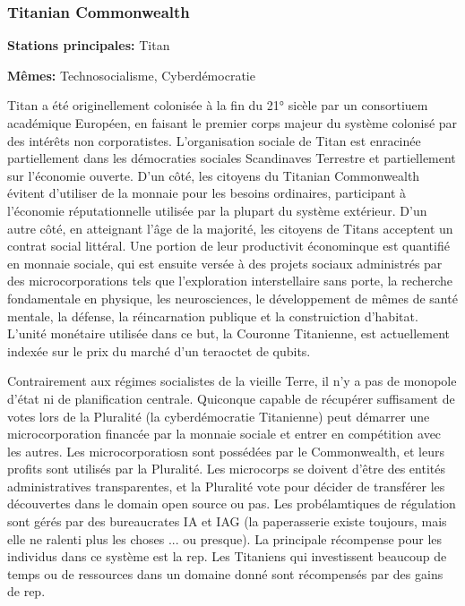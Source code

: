 \subsubsection{Titanian Commonwealth} \label{sec:titan-comm} 

\textbf{Stations principales:} Titan 

\textbf{Mêmes:} Technosocialisme, Cyberdémocratie 

Titan a été originellement colonisée à la fin du 21° sicèle par un consortiuem académique Européen, en faisant le premier corps majeur du système colonisé par des intérêts non corporatistes. L'organisation sociale de Titan est enracinée partiellement dans les démocraties sociales Scandinaves Terrestre et partiellement sur l'économie ouverte. D'un côté, les citoyens du Titanian Commonwealth évitent d'utiliser de la monnaie pour les besoins ordinaires, participant à l'économie réputationnelle utilisée par la plupart du système extérieur. D'un autre côté, en atteignant l'âge de la majorité, les citoyens de Titans acceptent un contrat social littéral. Une portion de leur productivit économinque est quantifié en monnaie sociale, qui est ensuite versée à des projets sociaux administrés par des microcorporations tels que l'exploration interstellaire sans porte, la recherche fondamentale en physique, les neurosciences, le développement de mêmes de santé mentale, la défense, la réincarnation publique et la construiction d'habitat. L'unité monétaire utilisée dans ce but, la Couronne Titanienne, est actuellement indexée sur le prix du marché d'un teraoctet de qubits. 

Contrairement aux régimes socialistes de la vieille Terre, il n'y a pas de monopole d'état ni de planification centrale. Quiconque capable de récupérer suffisament de votes lors de la Pluralité (la cyberdémocratie Titanienne) peut démarrer une microcorporation financée par la monnaie sociale et entrer en compétition avec les autres. Les microcorporatiosn sont possédées par le Commonwealth, et leurs profits sont utilisés par la Pluralité. Les microcorps se doivent d'être des entités administratives transparentes, et la Pluralité vote pour décider de transférer les découvertes dans le domain open source ou pas. Les probélamtiques de régulation sont gérés par des bureaucrates IA et IAG (la paperasserie existe toujours, mais elle ne ralenti plus les choses ... ou presque). La principale récompense pour les individus dans ce système est la rep. Les Titaniens qui investissent beaucoup de temps ou de ressources dans un domaine donné sont récompensés par des gains de rep. 

